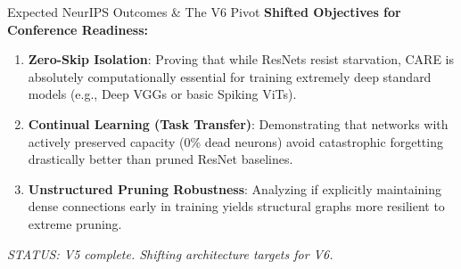 \documentclass[aspectratio=169]{beamer}
\begin{document}
\begin{frame}{Expected NeurIPS Outcomes \& The V6 Pivot}
    \textbf{Shifted Objectives for Conference Readiness:}
    \begin{enumerate}
        \item \textbf{Zero-Skip Isolation}: Proving that while ResNets resist starvation, CARE is absolutely computationally essential for training extremely deep standard models (e.g., Deep VGGs or basic Spiking ViTs).
        \item \textbf{Continual Learning (Task Transfer)}: Demonstrating that networks with actively preserved capacity (0\% dead neurons) avoid catastrophic forgetting drastically better than pruned ResNet baselines.
        \item \textbf{Unstructured Pruning Robustness}: Analyzing if explicitly maintaining dense connections early in training yields structural graphs more resilient to extreme pruning.
    \end{enumerate}
    
    \vspace{0.5cm}
    \centering
    \textit{STATUS: V5 complete. Shifting architecture targets for V6.}
\end{frame}
\end{document}
